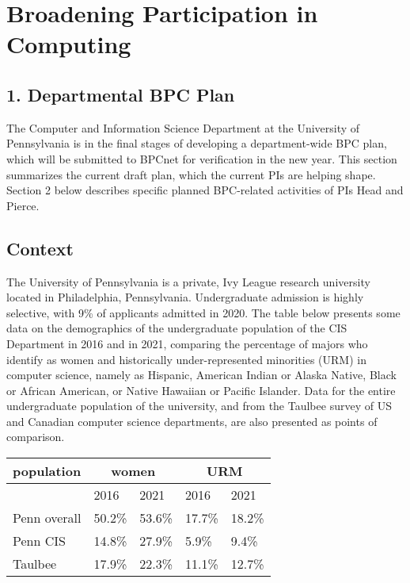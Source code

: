 
\section*{Broadening Participation in Computing}

\subsection*{1. Departmental BPC Plan}

The Computer and Information Science Department at the University of
Pennsylvania is in the final stages of developing a department-wide
BPC plan, which will be submitted to BPCnet for verification in the
new year.  This section summarizes the current draft plan, which the
current PIs are helping shape.  Section 2 below describes specific
planned BPC-related activities of PIs Head and Pierce.

\subsection*{Context}

The University of Pennsylvania is a private, Ivy League research university located in Philadelphia, Pennsylvania. Undergraduate admission is highly selective, with 9\% of applicants admitted in 2020. The table below presents some data on the demographics of the undergraduate population of the CIS Department in 2016 and in 2021, comparing the percentage of majors who identify as women and historically under-represented minorities (URM) in computer science, namely as Hispanic, American Indian or Alaska Native, Black or African American, or Native Hawaiian or Pacific Islander. Data for the entire undergraduate population of the university, and from the Taulbee survey of US and Canadian computer science departments, are also presented as points of comparison.

\begin{center}
\begin{tabular}{|l|l|l|l|l|}
\hline
  population & \multicolumn{2}{|c|}{women} & \multicolumn{2}{|c|}{URM}
\\
\hline
  & 2016 & 2021 & 2016 & 2021
\\
\hline
Penn overall &
50.2\% &
53.6\% &
17.7\% &
18.2\%
\\
Penn CIS &
14.8\% &
27.9\% &
5.9\% &
9.4\%
\\
Taulbee &
17.9\% &
22.3\% &
11.1\% &
12.7\% \\
\hline
\end{tabular}
\end{center}

